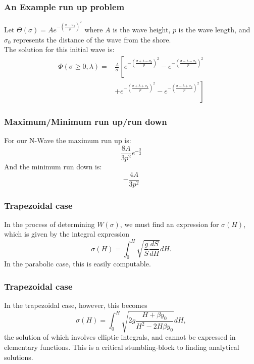 \begin{frame}
\frametitle{An Example run up problem}
Let $\Theta(\sigma)=A e^{-(\frac{\sigma-\sigma_0}{p})^2}$ where $A$ is the wave height, $p$ is the wave length, and $\sigma_0$ represents the distance of the wave from the shore.\\
The solution for this initial wave is:\\
\begin{align*}
\Phi(\sigma\geq0,\lambda)=&\frac{A}{\sigma} \left[ e^{-(\frac{\sigma+\lambda-\sigma_0}{p})^2}-e^{-(\frac{\sigma-\lambda-\sigma_0}{p})^2} \right. \\
&\left. +e^{-(\frac{\sigma+\lambda+\sigma_0}{p})^2}-e^{-(\frac{\sigma-\lambda+\sigma_0}{p})^2} \right]
\end{align*}
\end{frame}

\begin{frame}
\frametitle{Maximum/Minimum run up/run down}

For our N-Wave the maximum run up is:\[
\frac{8A}{3p^2}e^{-\frac{3}{2}}
\]
And the minimum run down is:\[
-\frac{4A}{3p^2}
\]
\end{frame}

\begin{frame}
\frametitle{Trapezoidal case}
In the process of determining $W(\sigma)$, we must find an expression for $\sigma(H)$, which is given by the integral expression
\[
\sigma(H) = \int_0^H \sqrt{\frac{g}{S} \frac{dS}{dH}}dH.
\]
In the parabolic case, this is easily computable. 
\end{frame}
\begin{frame}
\frametitle{Trapezoidal case}
In the trapezoidal case, however, this becomes
\[
\sigma(H) = \int_0^H \sqrt{2g\frac{H + \beta y_0}{H^2 - 2H \beta y_0}} dH,
\]
the solution of which involves elliptic integrals, and cannot be expressed in elementary functions. This is a critical stumbling-block to finding analytical solutions.
\end{frame}



